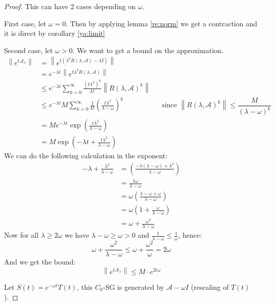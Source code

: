 \documentclass[12pt, oneside]{book}
\newcommand{\norm}[1]{\left\lVert#1\right\rVert}
\newcommand{\A}{\mathscr{A}}
\begin{document}
\begin{proof}
	This can have 2 cases depending on $\omega$.

	First case, let $\omega = 0$. Then by applying lemma \ref{re:norm} we get a contraction and it is direct by corollary \ref{ya:limit}

	\bigskip

	Second case, let $\omega > 0$. We want to get a bound on the approximation.
	\begin{align*}
		\norm{e^{t \A_{\lambda}}} &= \norm{e^{t (\lambda^2 R(\lambda, \A) - \lambda I)}} \\
					  &= e^{-\lambda t} \norm{e^{t \lambda^2 R(\lambda, \A)}} \\
					  &\le e^{-\lambda t} \sum_{k=0}^\infty \frac{(t \lambda^2)^k}{k!} \norm{R(\lambda, \A)^k} \\
					  &\le e^{-\lambda t} M \sum_{k=0}^\infty \frac{1}{k!} \left( \frac{t \lambda^2}{\lambda - \omega} \right)^k && \text{since } \norm{R(\lambda, \A)^k} \le \dfrac{M}{(\lambda - \omega)^k}\\
    &= M e^{-\lambda t} \exp\left( \frac{t \lambda^2}{\lambda - \omega} \right) \\
    &= M \exp\left( -\lambda t + \frac{t \lambda^2}{\lambda - \omega} \right)
\end{align*}
We can do the following calculation in the exponent:
\begin{align*}
	-\lambda + \frac{\lambda^2}{\lambda - \omega} &= \left( \frac{-\lambda(\lambda - \omega) + \lambda^2}{\lambda - \omega} \right) \\
						      & = \frac{\lambda \omega}{\lambda - \omega}\\
						      &= \omega \left( \frac{\lambda - \omega + \omega}{\lambda - \omega} \right)\\
						      &= \omega \left( 1 + \frac{\omega}{\lambda - \omega} \right)\\
						      &= \omega + \frac{\omega^2}{\lambda - \omega}
\end{align*}
Now for all $\lambda \ge 2 \omega$ we have $\lambda - \omega \ge \omega > 0$ and $\frac{1}{\lambda - \omega} \le \frac{1}{\omega}$, hence:
$$
\omega + \frac{\omega^2}{\lambda - \omega} \le \omega + \frac{\omega^2}{\omega} = 2 \omega
$$
And we get the bound:
\begin{equation} \label{hy:general_bound}
\norm{e^{t\A_{\lambda}}} \le M \cdot e^{2t\omega} \tag{*}
\end{equation}

Let $S(t) = e^{-\omega t}T(t)$, this $C_0$-SG is generated by $\A - \omega I$ (rescaling of $T(t)$).


\end{proof}
\end{document}
